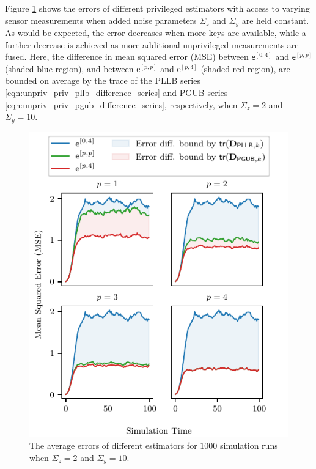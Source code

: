 Figure \ref{fig:mse_privs} shows the errors of different privileged estimators with access to varying sensor measurements when added noise parameters $\Sigma_z$ and $\Sigma_y$ are held constant. As would be expected, the error decreases when more keys are available, while a further decrease is achieved as more additional unprivileged measurements are fused. Here, the difference in mean squared error (MSE) between $\mathsf{e}^{[0,4]}$ and $\mathsf{e}^{[p,p]}$ (shaded blue region), and between $\mathsf{e}^{[p,p]}$ and $\mathsf{e}^{[p,4]}$ (shaded red region), are bounded on average by the trace of the PLLB series \eqref{eqn:unpriv_priv_pllb_difference_series} and PGUB series \eqref{eqn:unpriv_priv_pgub_difference_series}, respectively, when $\Sigma_z=2$ and $\Sigma_y=10$.
\begin{figure}[htbp]
  \centering
  \includegraphics{figures/mse_privs.pdf}
  \caption{The average errors of different estimators for $1000$ simulation runs when $\Sigma_z=2$ and $\Sigma_y=10$.}
  \label{fig:mse_privs}
\end{figure}


